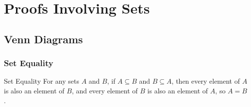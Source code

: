 \documentclass[\main/notes.tex]{subfiles}
\begin{document}
	\ifSubfilesClassLoaded{\setcounter{chapter}{3}}{}
	\chapter{Proofs Involving Sets}
		\section{Venn Diagrams}
			\subsection{Set Equality}
				\begin{definition}{Set Equality}
					For any sets $A$ and $B$, if $A \subseteq B$ and $B \subseteq A$, then every element of $A$ is also an element of $B$, and every element of $B$ is also an element of $A$, so $A = B$.
				\end{definition}
\end{document}

